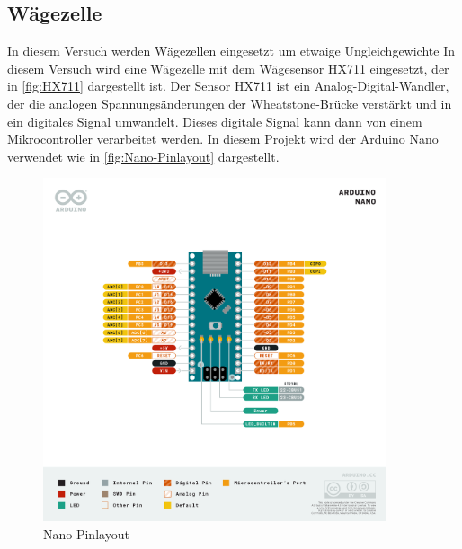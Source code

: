 \subsection{Wägezelle}

In diesem Versuch werden Wägezellen eingesetzt um etwaige Ungleichgewichte 
In diesem Versuch wird eine Wägezelle mit dem Wägesensor HX711 eingesetzt, der in \autoref{fig:HX711} dargestellt ist.
Der Sensor HX711 ist ein Analog-Digital-Wandler, der die analogen Spannungsänderungen der Wheatstone-Brücke verstärkt und in ein digitales Signal umwandelt.
Dieses digitale Signal kann dann von einem Mikrocontroller verarbeitet werden.
In diesem Projekt wird der Arduino Nano verwendet wie in \autoref{fig:Nano-Pinlayout} dargestellt.
\begin{figure}[h!]
    \centering
    \includegraphics[width=0.9\textwidth]{img/Nano-Pinlayout.png}
    \caption{Nano-Pinlayout \cite{Arduino}}
    \label{fig:Nano-Pinlayout}
\end{figure}

